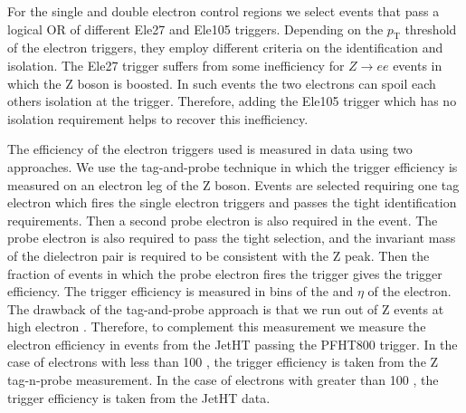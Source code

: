 For the single and double electron control regions we select events that pass a logical OR of different Ele27 and Ele105 triggers. Depending on the $p_\text{T}$ threshold of the electron triggers, they employ different criteria on the identification and isolation. 
The Ele27 trigger suffers from some inefficiency for $Z\to ee$ events in which the Z boson is boosted. In such events the two electrons can spoil each others isolation at the trigger. Therefore, adding the Ele105 trigger which has no isolation requirement helps to recover this inefficiency.

The efficiency of the electron triggers used is measured in data using two approaches. We use the tag-and-probe technique in which the trigger efficiency is measured on an electron leg of the Z boson. Events are selected requiring one tag electron which fires the single electron triggers and passes the tight identification requirements. Then a second probe electron is also required in the event. The probe electron is also required to pass the tight selection, and the invariant mass of the dielectron pair is required to be consistent with the Z peak. Then the fraction of events in which the probe electron fires the trigger gives the trigger efficiency. The trigger efficiency is measured in bins of the \pt and $\eta$ of the electron. The drawback of the tag-and-probe approach is that we run out of Z events at high electron \pt. Therefore, to complement this measurement we measure the electron efficiency in events from the JetHT passing the PFHT800 trigger. %
In the case of electrons with \pt less than 100 \GeV, the trigger efficiency is taken from the Z tag-n-probe measurement. In the case of electrons with \pt greater than 100 \GeV, the trigger efficiency is taken from the JetHT data.




